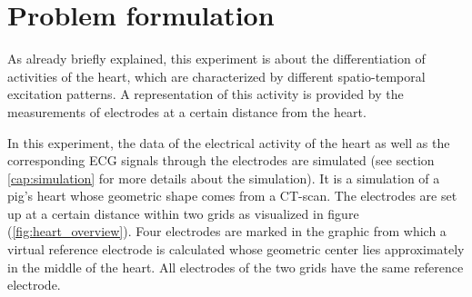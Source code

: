 






\section{Problem formulation}
As already briefly explained, this experiment is about the differentiation of activities of the heart, which are characterized by different spatio-temporal excitation patterns. A representation of this activity is provided by the measurements of electrodes at a certain distance from the heart.

In this experiment, the data of the electrical activity of the heart as well as the corresponding ECG signals through the electrodes are simulated (see section \ref{cap:simulation} for more details about the simulation). It is a simulation of a pig's heart whose geometric shape comes from a CT-scan. The electrodes are set up at a certain distance within two grids as visualized in figure (\ref{fig:heart_overview}). Four electrodes are marked in the graphic from which a virtual reference electrode is calculated whose geometric center lies approximately in the middle of the heart. All electrodes of the two grids have the same reference electrode.

